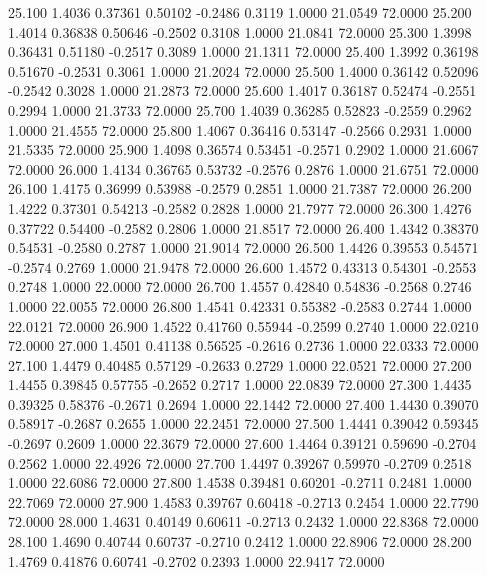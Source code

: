   25.100   1.4036   0.37361   0.50102  -0.2486   0.3119   1.0000  21.0549  72.0000
  25.200   1.4014   0.36838   0.50646  -0.2502   0.3108   1.0000  21.0841  72.0000
  25.300   1.3998   0.36431   0.51180  -0.2517   0.3089   1.0000  21.1311  72.0000
  25.400   1.3992   0.36198   0.51670  -0.2531   0.3061   1.0000  21.2024  72.0000
  25.500   1.4000   0.36142   0.52096  -0.2542   0.3028   1.0000  21.2873  72.0000
  25.600   1.4017   0.36187   0.52474  -0.2551   0.2994   1.0000  21.3733  72.0000
  25.700   1.4039   0.36285   0.52823  -0.2559   0.2962   1.0000  21.4555  72.0000
  25.800   1.4067   0.36416   0.53147  -0.2566   0.2931   1.0000  21.5335  72.0000
  25.900   1.4098   0.36574   0.53451  -0.2571   0.2902   1.0000  21.6067  72.0000
  26.000   1.4134   0.36765   0.53732  -0.2576   0.2876   1.0000  21.6751  72.0000
  26.100   1.4175   0.36999   0.53988  -0.2579   0.2851   1.0000  21.7387  72.0000
  26.200   1.4222   0.37301   0.54213  -0.2582   0.2828   1.0000  21.7977  72.0000
  26.300   1.4276   0.37722   0.54400  -0.2582   0.2806   1.0000  21.8517  72.0000
  26.400   1.4342   0.38370   0.54531  -0.2580   0.2787   1.0000  21.9014  72.0000
  26.500   1.4426   0.39553   0.54571  -0.2574   0.2769   1.0000  21.9478  72.0000
  26.600   1.4572   0.43313   0.54301  -0.2553   0.2748   1.0000  22.0000  72.0000
  26.700   1.4557   0.42840   0.54836  -0.2568   0.2746   1.0000  22.0055  72.0000
  26.800   1.4541   0.42331   0.55382  -0.2583   0.2744   1.0000  22.0121  72.0000
  26.900   1.4522   0.41760   0.55944  -0.2599   0.2740   1.0000  22.0210  72.0000
  27.000   1.4501   0.41138   0.56525  -0.2616   0.2736   1.0000  22.0333  72.0000
  27.100   1.4479   0.40485   0.57129  -0.2633   0.2729   1.0000  22.0521  72.0000
  27.200   1.4455   0.39845   0.57755  -0.2652   0.2717   1.0000  22.0839  72.0000
  27.300   1.4435   0.39325   0.58376  -0.2671   0.2694   1.0000  22.1442  72.0000
  27.400   1.4430   0.39070   0.58917  -0.2687   0.2655   1.0000  22.2451  72.0000
  27.500   1.4441   0.39042   0.59345  -0.2697   0.2609   1.0000  22.3679  72.0000
  27.600   1.4464   0.39121   0.59690  -0.2704   0.2562   1.0000  22.4926  72.0000
  27.700   1.4497   0.39267   0.59970  -0.2709   0.2518   1.0000  22.6086  72.0000
  27.800   1.4538   0.39481   0.60201  -0.2711   0.2481   1.0000  22.7069  72.0000
  27.900   1.4583   0.39767   0.60418  -0.2713   0.2454   1.0000  22.7790  72.0000
  28.000   1.4631   0.40149   0.60611  -0.2713   0.2432   1.0000  22.8368  72.0000
  28.100   1.4690   0.40744   0.60737  -0.2710   0.2412   1.0000  22.8906  72.0000
  28.200   1.4769   0.41876   0.60741  -0.2702   0.2393   1.0000  22.9417  72.0000
